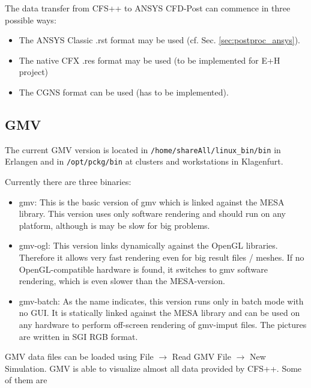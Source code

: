 The data transfer  from CFS++ to ANSYS CFD-Post can  commence in three possible
ways:

\begin{itemize}
\item     The     ANSYS     Classic     .rst    format     may     be     used
(cf. Sec. \ref{sec:postproc_ansys}).

\item  The native  CFX .res  format may  be used  (to be  implemented  for E+H
project)

\item The CGNS format can be used (has to be implemented).
\end{itemize}


\subsection{GMV}
\label{sec:postproc_gmv}
\noindent     The      current     GMV      version     is      located     in
\texttt{/home/shareAll/linux\_bin/bin} in Erlangen  and in {\tt /opt/pckg/bin}
at clusters and workstations in Klagenfurt.

\noindent Currently there are three binaries:

\begin{itemize}
    \item gmv:  This is the basic version  of gmv which is  linked against the
MESA library. This version uses only  software rendering and should run on any
platform, although is may be slow for big problems.
    \item  gmv-ogl:   This  version  links  dynamically   against  the  OpenGL
libraries. Therefore it allows very fast rendering even for big result files /
meshes. If no OpenGL-compatible hardware is found, it switches to gmv software
rendering, which is even slower than the MESA-version.
    \item gmv-batch:  As the name indicates,  this version runs  only in batch
mode with no GUI. It is statically  linked against the MESA library and can be
used on any  hardware to perform off-screen rendering  of gmv-imput files. The
pictures are written in SGI RGB format.
\end{itemize}

GMV  data  files  can  be  loaded  using  File  $\rightarrow$  Read  GMV  File
$\rightarrow$  New Simulation.   GMV  is  able to  visualize  almost all  data
provided by CFS++. Some of them are

